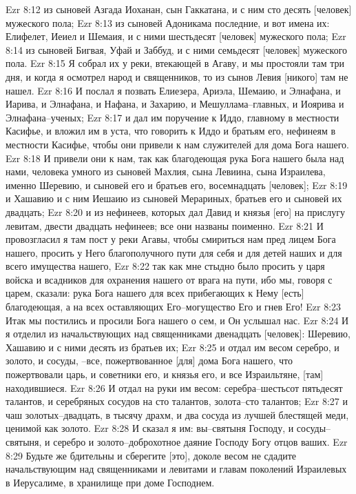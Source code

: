 Ezr 8:12  из сыновей Азгада Иоханан, сын Гаккатана, и с ним сто десять [человек] мужеского пола;
Ezr 8:13  из сыновей Адоникама последние, и вот имена их: Елифелет, Иеиел и Шемаия, и с ними шестьдесят [человек] мужеского пола;
Ezr 8:14  из сыновей Бигвая, Уфай и Заббуд, и с ними семьдесят [человек] мужеского пола.
Ezr 8:15  Я собрал их у реки, втекающей в Агаву, и мы простояли там три дня, и когда я осмотрел народ и священников, то из сынов Левия [никого] там не нашел.
Ezr 8:16  И послал я позвать Елиезера, Ариэла, Шемаию, и Элнафана, и Иарива, и Элнафана, и Нафана, и Захарию, и Мешуллама--главных, и Иоярива и Элнафана--ученых;
Ezr 8:17  и дал им поручение к Иддо, главному в местности Касифье, и вложил им в уста, что говорить к Иддо и братьям его, нефинеям в местности Касифье, чтобы они привели к нам служителей для дома Бога нашего.
Ezr 8:18  И привели они к нам, так как благодеющая рука Бога нашего была над нами, человека умного из сыновей Махлия, сына Левиина, сына Израилева, именно Шеревию, и сыновей его и братьев его, восемнадцать [человек];
Ezr 8:19  и Хашавию и с ним Иешаию из сыновей Мерариных, братьев его и сыновей их двадцать;
Ezr 8:20  и из нефинеев, которых дал Давид и князья [его] на прислугу левитам, двести двадцать нефинеев; все они названы поименно.
Ezr 8:21  И провозгласил я там пост у реки Агавы, чтобы смириться нам пред лицем Бога нашего, просить у Него благополучного пути для себя и для детей наших и для всего имущества нашего,
Ezr 8:22  так как мне стыдно было просить у царя войска и всадников для охранения нашего от врага на пути, ибо мы, говоря с царем, сказали: рука Бога нашего для всех прибегающих к Нему [есть] благодеющая, а на всех оставляющих Его--могущество Его и гнев Его!
Ezr 8:23  Итак мы постились и просили Бога нашего о сем, и Он услышал нас.
Ezr 8:24  И я отделил из начальствующих над священниками двенадцать [человек]: Шеревию, Хашавию и с ними десять из братьев их;
Ezr 8:25  и отдал им весом серебро, и золото, и сосуды, --все, пожертвованное [для] дома Бога нашего, что пожертвовали царь, и советники его, и князья его, и все Израильтяне, [там] находившиеся.
Ezr 8:26  И отдал на руки им весом: серебра--шестьсот пятьдесят талантов, и серебряных сосудов на сто талантов, золота--сто талантов;
Ezr 8:27  и чаш золотых--двадцать, в тысячу драхм, и два сосуда из лучшей блестящей меди, ценимой как золото.
Ezr 8:28  И сказал я им: вы--святыня Господу, и сосуды--святыня, и серебро и золото--доброхотное даяние Господу Богу отцов ваших.
Ezr 8:29  Будьте же бдительны и сберегите [это], доколе весом не сдадите начальствующим над священниками и левитами и главам поколений Израилевых в Иерусалиме, в хранилище при доме Господнем.
